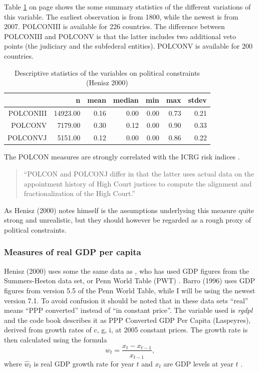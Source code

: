 \documentclass{article}\usepackage{graphicx, color}
\begin{document}
Table \ref{POLCON_tab} on page \pageref{POLCON_tab} shows the some
summary statistics of the different variations of this variable. The
earliest observation is from 1800, while the
newest is from 2007. POLCONIII is available for
226 countries. The difference between POLCONIII and POLCONV is that
the latter includes two additional veto points (the judiciary and
the subfederal entities). POLCONV is available for 200 countries.

\begin{table}[ht]
\centering
\begin{tabular}{rrrrrrr}
  \hline
 & n & mean & median & min & max & stdev \\ 
  \hline
POLCONIII & 14923.00 & 0.16 & 0.00 & 0.00 & 0.73 & 0.21 \\ 
  POLCONV & 7179.00 & 0.30 & 0.12 & 0.00 & 0.90 & 0.33 \\ 
  POLCONVJ & 5151.00 & 0.12 & 0.00 & 0.00 & 0.86 & 0.22 \\ 
   \hline
\end{tabular}
\caption{Descriptive statistics of the variables on political constraints (Henisz 2000)} 
\label{POLCON_tab}
\end{table}



The POLCON measures are strongly correlated with the ICRG risk indices
\citep[p. 10]{henisz2000theinstitutional}.
\begin{quotation}
``POLCON and POLCONJ differ in that the latter uses actual data on
the appointment history of High Court justices to compute the alignment
and fractionalization of the High Court.''\citep[p. 10]{henisz2000theinstitutional}
\end{quotation}
As Henisz (2000) notes himself is the assumptions underlysing this
measure quite strong and unrealistic, but they should however be regarded
as a rough proxy of political constraints.


\subsubsection{Measures of real GDP per capita\label{sub:Measures-of-gdp}}

Henisz (2000) uses some the same data as \citet{barro1996democracy},
who has used GDP figures from the Summers-Heston data set, or Penn
World Table (PWT) \citep{heston2012pennworld}. Barro (1996) uses
GDP figures from version 5.5 of the Penn World Table, while I will
be using the newest version 7.1. To avoid confusion it should be noted
that in these data sets ``real'' means ``PPP converted'' instead
of ``in constant price''. The variable used is \emph{rgdpl} and
the code book describes it as PPP Converted GDP Per Capita (Laspeyres),
derived from growth rates of c, g, i, at 2005 constant prices. The
growth rate is then calculated using the formula 
\[
\hat{w}_{t}=\frac{x_{t}-x_{t-1}}{x_{t-1}},
\]
 where $\hat{w}_{t}$ is real GDP growth rate for year $t$ and $x_{t}$
are GDP levels at year $t$ \citep{universityofzurich2010logarithms}.
\end{document}
